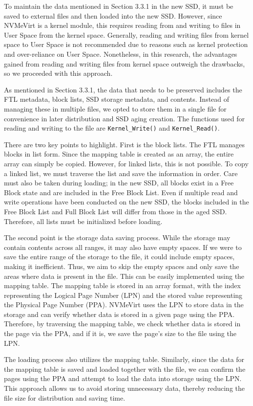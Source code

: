 To maintain the data mentioned in Section 3.3.1 in the new SSD, it must be saved to external files and then loaded into the new SSD.
However, since NVMeVirt is a kernel module, this requires reading from and writing to files in User Space from the kernel space.
Generally, reading and writing files from kernel space to User Space is not recommended due to reasons such as kernel protection and over-reliance on User Space.
Nonetheless, in this research, the advantages gained from reading and writing files from kernel space outweigh the drawbacks, so we proceeded with this approach.


As mentioned in Section 3.3.1, the data that needs to be preserved includes the FTL metadata, block lists, SSD storage metadata, and contents.
Instead of managing these in multiple files, we opted to store them in a single file for convenience in later distribution and SSD aging creation.
The functions used for reading and writing to the file are \texttt{Kernel\_Write()} and \texttt{Kernel\_Read()}.

There are two key points to highlight.
First is the block lists.
The FTL manages blocks in list form.
Since the mapping table is created as an array, the entire array can simply be copied.
However, for linked lists, this is not possible.
To copy a linked list, we must traverse the list and save the information in order.
Care must also be taken during loading; in the new SSD, all blocks exist in a Free Block state and are included in the Free Block List.
Even if multiple read and write operations have been conducted on the new SSD, the blocks included in the Free Block List and Full Block List will differ from those in the aged SSD.
Therefore, all lists must be initialized before loading.

The second point is the storage data saving process.
While the storage may contain contents across all ranges, it may also have empty spaces.
If we were to save the entire range of the storage to the file, it could include empty spaces, making it inefficient.
Thus, we aim to skip the empty spaces and only save the areas where data is present in the file.
This can be easily implemented using the mapping table.
The mapping table is stored in an array format, with the index representing the Logical Page Number (LPN) and the stored value representing the Physical Page Number (PPA).
NVMeVirt uses the LPN to store data in the storage and can verify whether data is stored in a given page using the PPA.
Therefore, by traversing the mapping table, we check whether data is stored in the page via the PPA, and if it is, we save the page's size to the file using the LPN.


The loading process also utilizes the mapping table.
Similarly, since the data for the mapping table is saved and loaded together with the file, we can confirm the pages using the PPA and attempt to load the data into storage using the LPN.
This approach allows us to avoid storing unnecessary data, thereby reducing the file size for distribution and saving time.
